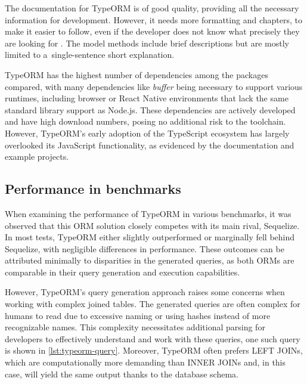 The documentation for TypeORM is of good quality, providing all the necessary
information for development. However, it needs more formatting and chapters,
to make it easier to follow, even if the developer does not know what precisely
they are looking for \cite{typeORMDocs}. The model methods include brief
descriptions but are mostly limited to a~single-sentence short explanation.

TypeORM has the highest number of dependencies among the packages compared, with
many dependencies like \textit{buffer} being necessary to support various
runtimes, including browser or React Native environments that lack the same
standard library support as Node.js. These dependencies are actively developed
and have high download numbers, posing no additional risk to the toolchain.
However, TypeORM's early adoption of the TypeScript ecosystem has largely
overlooked its JavaScript functionality, as evidenced by the documentation and
example projects.

\subsection*{Performance in benchmarks}

When examining the performance of TypeORM in various benchmarks, it was observed
that this ORM solution closely competes with its main rival, Sequelize. In most
tests, TypeORM either slightly outperformed or marginally fell behind Sequelize,
with negligible differences in performance. These outcomes can be attributed
minimally to disparities in the generated queries, as both ORMs are comparable
in their query generation and execution capabilities.

However, TypeORM's query generation approach raises some concerns when working
with complex joined tables. The generated queries are often complex for humans
to read due to excessive naming or using hashes instead of more recognizable
names. This complexity necessitates additional parsing for developers to
effectively understand and work with these queries, one such query is shown in
\autoref{lst:typeorm-query}. Moreover, TypeORM often prefers LEFT JOINs, which
are computationally more demanding than INNER JOINs and, in this case, will
yield the same output thanks to the database schema.

